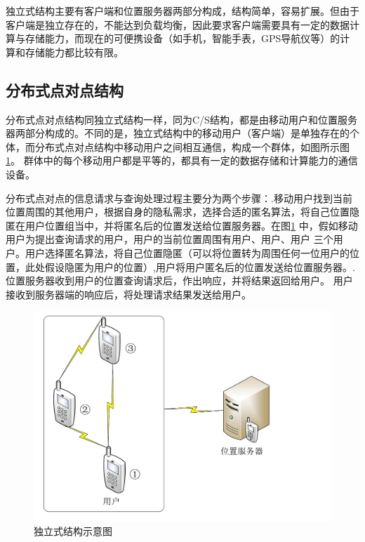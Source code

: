 独立式结构主要有客户端和位置服务器两部分构成，结构简单，容易扩展。但由于客户端是独立存在的，不能达到负载均衡，因此要求客户端需要具有一定的数据计算与存储能力，而现在的可便携设备（如手机，智能手表，GPS导航仪等）的计算和存储能力都比较有限。
\subsection{分布式点对点结构}
分布式点对点结构\cite{Gruteser}同独立式结构一样，同为C/S结构，都是由移动用户和位置服务器两部分构成的。不同的是，独立式结构中的移动用户（客户端）是单独存在的个体，而分布式点对点结构中移动用户之间相互通信，构成一个群体，如图所示图\ref{fig:p2p_pdf}。 群体中的每个移动用户都是平等的，都具有一定的数据存储和计算能力的通信设备。

分布式点对点的信息请求与查询处理过程主要分为两个步骤：.移动用户找到当前位置周围的其他用户，根据自身的隐私需求，选择合适的匿名算法，将自己位置隐匿在用户位置组当中，并将匿名后的位置发送给位置服务器。在图\ref{fig:p2p_pdf} 中，假如移动用户为提出查询请求的用户，用户的当前位置周围有用户、用户、用户 三个用户。用户选择匿名算法，将自己位置隐匿（可以将位置转为周围任何一位用户的位置，此处假设隐匿为用户的位置）,用户将用户匿名后的位置发送给位置服务器。.位置服务器收到用户的位置查询请求后，作出响应，并将结果返回给用户。 用户 接收到服务器端的响应后，将处理请求结果发送给用户。


\begin{figure}[H]
\centering
\includegraphics[width=12cm]{fig/p2p.pdf}
\caption{独立式结构示意图} %
\label{fig:p2p_pdf}
\end{figure}

